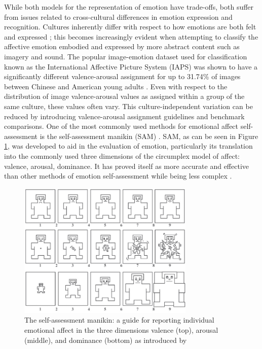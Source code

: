 \documentclass{article}
\begin{document}
While both models for the representation of emotion have trade-offs, both suffer from issues related to cross-cultural differences in emotion expression and recognition.
Cultures inherently differ with respect to how emotions are both felt and expressed \citep{markus1991culture}; this becomes increasingly evident when attempting to classify the affective emotion embodied and expressed by more abstract content such as imagery and sound.
The popular image-emotion dataset used for classification known as the International Affective Picture System (IAPS) was shown to have a significantly different valence-arousal assignment for up to 31.74\% of images between Chinese and American young adults \citep{huang2015affective}.
Even with respect to the distribution of image valence-arousal values as assigned within a group of the same culture, these values often vary.
This culture-independent variation can be reduced by introducing valence-arousal assignment guidelines and benchmark comparisons.
One of the most commonly used methods for emotional affect self-assessment is the self-assessment manikin (SAM) \citep{lang1980behavioral}.
SAM, as can be seen in Figure \ref{fig:SAM}, was developed to aid in the evaluation of emotion, particularly its translation into the commonly used three dimensions of the circumplex model of affect: valence, arousal, dominance.
It has proved itself as more accurate and effective than other methods of emotion self-assessment while being less complex \citep{bradley1994measuring}.

\begin{figure}[h!]
	\centering
	\includegraphics[width=0.75\textwidth]{images/self-assessment-manikin.png}
	\caption{The self-assessment manikin: a guide for reporting individual emotional affect in the three dimensions valence (top), arousal (middle), and dominance (bottom) as introduced by \citet{lang1980behavioral}}
	\label{fig:SAM}
\end{figure}
\end{document}
